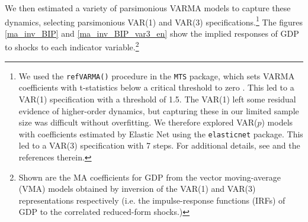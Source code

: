 \documentclass[11pt,a4paper]{article}
\begin{document}
We then estimated a variety of parsimonious VARMA models to capture these dynamics, selecting parsimonious VAR(1) and VAR(3) specifications.\footnote{We used the \texttt{refVARMA()} procedure in the \cite{MTSpackage} \texttt{MTS} package, which sets VARMA coefficients with t-statistics below a critical threshold to zero \citep[see][]{tsay2013multivariate}.  This led to a VAR(1) specification with a threshold of 1.5. The VAR(1) left some residual evidence of higher-order dynamics, but capturing these in our limited sample size was difficult without overfitting. We therefore explored VAR($p$) models with coefficients estimated by Elastic Net using the \cite{ElasticNet} \texttt{elasticnet} package.  This led to a VAR(3) specification with 7 steps. For additional details, see \cite{ElasticNet} and the references therein.} The figures \ref{ma_inv_BIP} and \ref{ma_inv_BIP_var3_en} show the implied responses of GDP to shocks to each indicator variable.\footnote{Shown are the MA coefficients for GDP from the vector moving-average (VMA) models obtained by inversion of the VAR(1) and VAR(3) representations respectively (i.e. the impulse-response functions (IRFs) of GDP to the correlated reduced-form shocks.)} 

%
%



%
%
%
\end{document}
